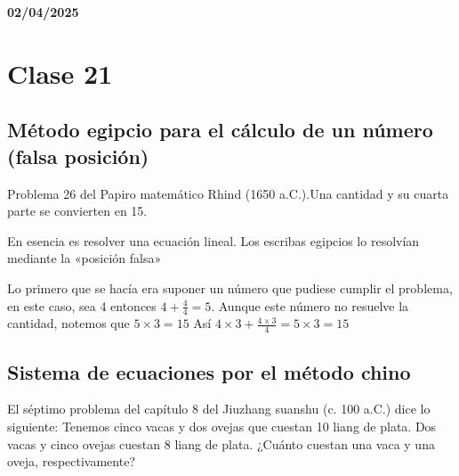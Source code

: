 \textbf{02/04/2025}
\section{Clase 21}

\subsection{Método egipcio para el cálculo de un número (falsa posición)}
Problema 26 del Papiro matemático Rhind (1650 a.C.).Una cantidad y su cuarta parte se convierten en 15. 

En esencia es resolver una ecuación lineal. Los escribas egipcios lo resolvían mediante la «posición falsa»

\par
\begin{minipage}[t]{0.48\textwidth}
    Lo primero que se hacía era suponer un número que pudiese cumplir el problema, en este caso, sea 4 entonces $4 + \frac{4}{4} = 5$. Aunque este número no resuelve la cantidad, notemos que $5\times 3 = 15$ Así $4 \times 3+ \frac{4\times 3}{4} = 5\times3 = 15$
\end{minipage}
\begin{minipage}[t]{0.48\textwidth}
    
\end{minipage}
\par

\subsection{Sistema de ecuaciones por el método chino}
El séptimo problema del capítulo 8 del Jiuzhang suanshu (c. 100 a.C.) dice lo siguiente: Tenemos cinco vacas y dos ovejas que cuestan 10 liang de plata. Dos vacas y cinco ovejas cuestan 8 liang de plata. ¿Cuánto cuestan una vaca y una oveja, respectivamente?

